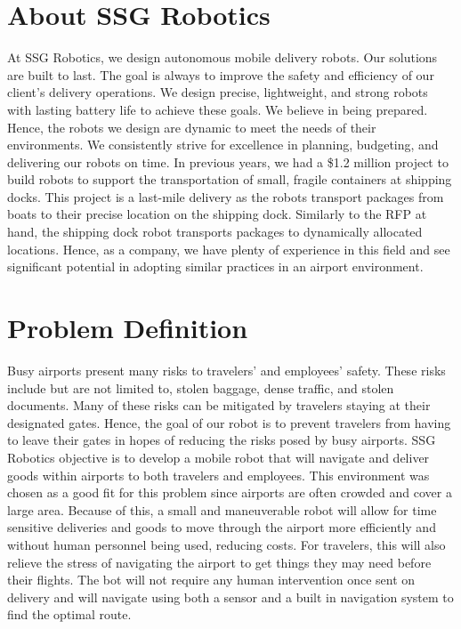 \documentclass[letterpaper,fleqn,oneside]{template}
\begin{document}
\section{About SSG Robotics}
At SSG Robotics, we design autonomous mobile delivery robots. Our solutions are built to last. The goal is always to improve the safety and efficiency of our client’s delivery operations. We design precise, lightweight, and strong robots with lasting battery life to achieve these goals. We believe in being prepared. Hence, the robots we design are dynamic to meet the needs of their environments. We consistently strive for excellence in planning, budgeting, and delivering our robots on time. In previous years, we had a \$1.2 million project to build robots to support the transportation of small, fragile containers at shipping docks. This project is a last-mile delivery as the robots transport packages from boats to their precise location on the shipping dock. Similarly to the RFP at hand, the shipping dock robot transports packages to dynamically allocated locations. Hence, as a company, we have plenty of experience in this field and see significant potential in adopting similar practices in an airport environment.


\section{Problem Definition}
Busy airports present many risks to travelers' and employees' safety. These risks include but are not limited to, stolen baggage, dense traffic, and stolen documents. Many of these risks can be mitigated by travelers staying at their designated gates. Hence, the goal of our robot is to prevent travelers from having to leave their gates in hopes of reducing the risks posed by busy airports. SSG Robotics objective is to develop a mobile robot that will navigate and deliver goods within airports to both travelers and employees. This environment was chosen as a good fit for this problem since airports are often crowded and cover a large area. Because of this, a small and maneuverable robot will allow for time sensitive deliveries and goods to move through the airport more efficiently and without human personnel being used, reducing costs. For travelers, this will also relieve the stress of navigating the airport to get things they may need before their flights. The bot will not require any human intervention once sent on delivery and will navigate using both a sensor and a built in navigation system to find the optimal route. 
\end{document}
